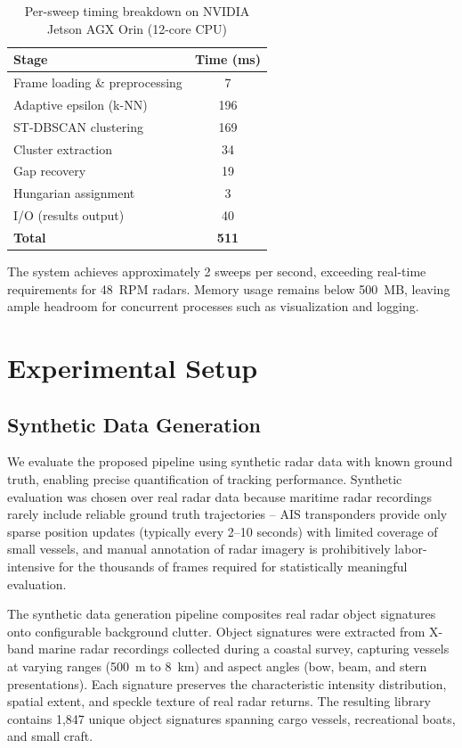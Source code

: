 \documentclass[conf]{new-aiaa}
\begin{document}
\begin{table}[h]
\centering
\caption{Per-sweep timing breakdown on NVIDIA Jetson AGX Orin (12-core CPU)}
\label{tab:timing}
\begin{tabular*}{\textwidth}{@{\extracolsep{\fill}}lc@{}}
\toprule
\textbf{Stage} & \textbf{Time (ms)} \\
\midrule
Frame loading \& preprocessing & 7 \\
Adaptive epsilon (k-NN) & 196 \\
ST-DBSCAN clustering & 169 \\
Cluster extraction & 34 \\
Gap recovery & 19 \\
Hungarian assignment & 3 \\
I/O (results output) & 40 \\
\midrule
\textbf{Total} & \textbf{511} \\
\bottomrule
\end{tabular*}
\end{table}

The system achieves approximately 2 sweeps per second, exceeding real-time requirements for 48~RPM radars. Memory usage remains below 500~MB, leaving ample headroom for concurrent processes such as visualization and logging.

\section{Experimental Setup}

\subsection{Synthetic Data Generation}

We evaluate the proposed pipeline using synthetic radar data with known ground truth, enabling precise quantification of tracking performance. Synthetic evaluation was chosen over real radar data because maritime radar recordings rarely include reliable ground truth trajectories -- AIS transponders provide only sparse position updates (typically every 2--10 seconds) with limited coverage of small vessels, and manual annotation of radar imagery is prohibitively labor-intensive for the thousands of frames required for statistically meaningful evaluation.

The synthetic data generation pipeline composites real radar object signatures onto configurable background clutter. Object signatures were extracted from X-band marine radar recordings collected during a coastal survey, capturing vessels at varying ranges (500~m to 8~km) and aspect angles (bow, beam, and stern presentations). Each signature preserves the characteristic intensity distribution, spatial extent, and speckle texture of real radar returns. The resulting library contains 1,847 unique object signatures spanning cargo vessels, recreational boats, and small craft.
\end{document}
